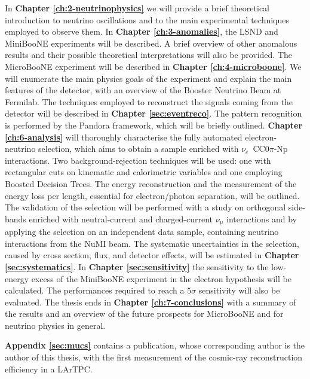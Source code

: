 In \textbf{Chapter \ref{ch:2-neutrinophysics}} we will provide a brief theoretical introduction to neutrino oscillations and to the main experimental techniques employed to observe them.
In \textbf{Chapter \ref{ch:3-anomalies}}, the LSND and MiniBooNE experiments will be described. A brief overview of other anomalous results and their possible theoretical interpretations will also be provided.
The MicroBooNE experiment will be described in \textbf{Chapter \ref{ch:4-microboone}}. We will enumerate the main physics goals of the experiment and explain the main features of the detector, with an overview of the Booster Neutrino Beam at Fermilab.
The techniques employed to reconstruct the signals coming from the detector will be described in \textbf{Chapter \ref{sec:eventreco}}. The pattern recognition is performed by the Pandora framework, which will be briefly outlined.
\textbf{Chapter \ref{ch:6-analysis}} will thoroughly characterise the fully automated electron-neutrino selection, which aims to obtain a sample enriched with $\nu_e$~CC0$\pi$-Np interactions. Two background-rejection techniques will be used: one with rectangular cuts on kinematic and calorimetric variables and one employing Boosted Decision Trees. The energy reconstruction and the measurement of the energy loss per length, essential for electron/photon separation, will be outlined. The validation of the selection will be performed with a study on orthogonal side-bands enriched with neutral-current and charged-current $\nu_{\mu}$ interactions and by applying the selection on an independent data sample, containing neutrino interactions from the NuMI beam. The systematic uncertainties in the selection, caused by cross section, flux, and detector effects, will be estimated in \textbf{Chapter \ref{sec:systematics}}.
In \textbf{Chapter \ref{sec:sensitivity}} the sensitivity to the low-energy excess of the MiniBooNE experiment in the electron hypothesis will be calculated. The performances required to reach a $5\sigma$ sensitivity will also be evaluated.
The thesis ends in \textbf{Chapter \ref{ch:7-conclusions}} with a summary of the results and an overview of the future prospects for MicroBooNE and for neutrino physics in general. 

\vspace{1em}

\textbf{Appendix \ref{sec:mucs}} contains a publication, whose corresponding author is the author of this thesis, with the first measurement of the cosmic-ray reconstruction efficiency in a LArTPC.